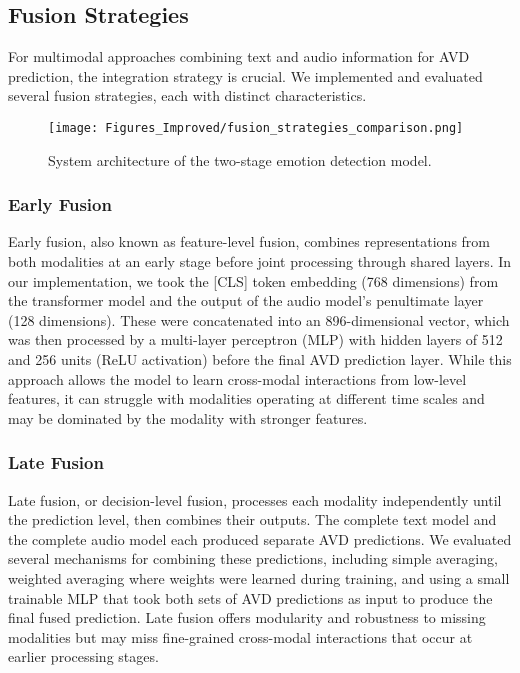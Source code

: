 \documentclass[12pt]{article}
\begin{document}
\subsection{Fusion Strategies}
\label{subsec:fusion}
For multimodal approaches combining text and audio information for AVD prediction, the integration strategy is crucial. We implemented and evaluated several fusion strategies, each with distinct characteristics.

\begin{figure}[h]
    \centering
    \texttt{[image: Figures\_Improved/fusion\_strategies\_comparison.png]}
    \caption{System architecture of the two-stage emotion detection model.}
    \label{fig:fusion_strategies}
\end{figure}

\subsubsection{Early Fusion}
Early fusion, also known as feature-level fusion, combines representations from both modalities at an early stage before joint processing through shared layers. In our implementation, we took the [CLS] token embedding (768 dimensions) from the transformer model and the output of the audio model's penultimate layer (128 dimensions). These were concatenated into an 896-dimensional vector, which was then processed by a multi-layer perceptron (MLP) with hidden layers of 512 and 256 units (ReLU activation) before the final AVD prediction layer. While this approach allows the model to learn cross-modal interactions from low-level features, it can struggle with modalities operating at different time scales and may be dominated by the modality with stronger features.

\subsubsection{Late Fusion}
Late fusion, or decision-level fusion, processes each modality independently until the prediction level, then combines their outputs. The complete text model and the complete audio model each produced separate AVD predictions. We evaluated several mechanisms for combining these predictions, including simple averaging, weighted averaging where weights were learned during training, and using a small trainable MLP that took both sets of AVD predictions as input to produce the final fused prediction. Late fusion offers modularity and robustness to missing modalities but may miss fine-grained cross-modal interactions that occur at earlier processing stages.
\end{document}
